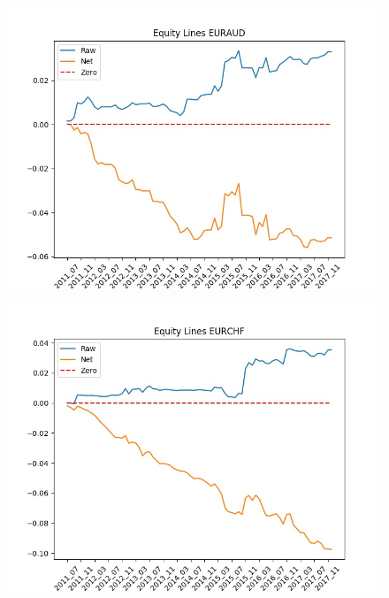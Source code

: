 \documentclass[a4paper]{article}
\begin{document}
\begin{figure}[h]
\begin{minipage}{.5\textwidth}
		\includegraphics[width=\linewidth]{Figures/EURAUD.jpeg}
		\label{fig:13}
	\end{minipage}%
	\begin{minipage}{.5\textwidth}
		\centering
		\includegraphics[width=\linewidth]{Figures/EURCHF.jpeg}
		\label{fig:14}
	\end{minipage}
\end{figure}
\end{document}
